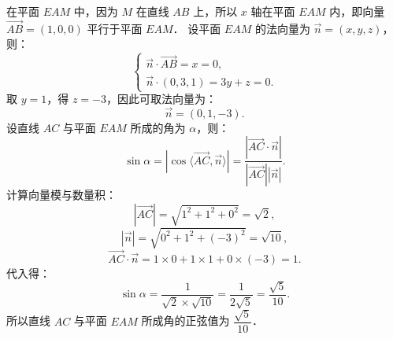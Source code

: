 \begin{answer}
在平面 $EAM$ 中，因为 $M$ 在直线 $AB$ 上，所以 $x$ 轴在平面 $EAM$ 内，即向量 $\overrightarrow{AB} = (1, 0, 0)$ 平行于平面 $EAM$．
设平面 $EAM$ 的法向量为 $\vec{n} = (x, y, z)$，则：
\nopagebreak[4]
\[
\begin{cases}
\vec{n} \cdot \overrightarrow{AB} = x = 0, \\
\vec{n} \cdot (0, 3, 1) = 3y + z = 0.
\end{cases}
\]
取 $y = 1$，得 $z = -3$，因此可取法向量为：
\nopagebreak[4]
\[
\vec{n} = (0, 1, -3).
\]
设直线 $AC$ 与平面 $EAM$ 所成的角为 $\alpha$，则：
\nopagebreak[4]
\[
\sin\alpha = |\cos\langle \overrightarrow{AC}, \vec{n}\rangle| = \frac{|\overrightarrow{AC} \cdot \vec{n}|}{|\overrightarrow{AC}| |\vec{n}|}.
\]
计算向量模与数量积：
\nopagebreak[4]
\[
|\overrightarrow{AC}| = \sqrt{1^2 + 1^2 + 0^2} = \sqrt{2},
\]
\nopagebreak[4]
\[
|\vec{n}| = \sqrt{0^2 + 1^2 + (-3)^2} = \sqrt{10},
\]
\nopagebreak[4]
\[
\overrightarrow{AC} \cdot \vec{n} = 1 \times 0 + 1 \times 1 + 0 \times (-3) = 1.
\]
代入得：
\nopagebreak[4]
\[
\sin\alpha = \frac{1}{\sqrt{2} \times \sqrt{10}} = \frac{1}{2\sqrt{5}} = \frac{\sqrt{5}}{10}.
\]
所以直线 $AC$ 与平面 $EAM$ 所成角的正弦值为 $\dfrac{\sqrt{5}}{10}$．



\end{answer}
